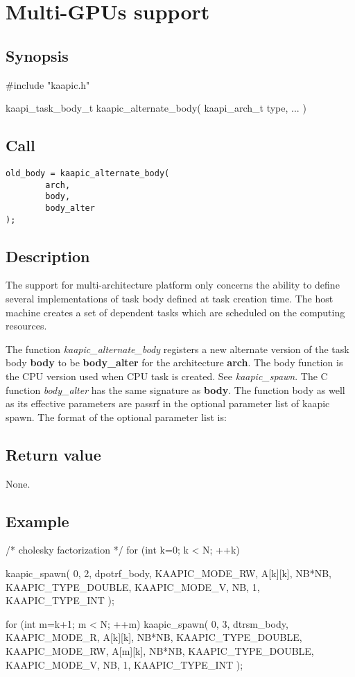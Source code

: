\documentclass[a4paper, 11pt]{article}
\makeatletter
\newenvironment{apisection}[2][noshortnameprovided]{%
  \newpage
  \section{#2}
  \label{api@#1}
  \newcommand{\api@newpart}[4][noshortpartnameprovided]{%
    \newenvironment{##1}{%
      \subsection{##2}%
      \label{api@#1@##1}%
      ##3%
    }{##4}%
  }%
  \api@newpart[synopsis]{Synopsis}{}{}%
  \api@newpart[call]{Call}{}{}%
  \api@newpart[desc]{Description}{}{}%
  \api@newpart[params]{Parameters}{%
    \let\api@indesc\@empty
    \newcommand{\param}[1]{%
      \def\api@indesc{yes}%
      \begin{description}%
        \renewcommand{\param}[1]{\item[########1]}%
      \item[####1]
      }%
      \newenvironment{parameters}{%
        \begin{description}%
          \renewcommand{\param}[1]{\item[########1]}%
        }{%
        \end{description}%
      }
    }{%
      \ifx\api@indesc\@empty\relax\else%
    \end{description}%
    \fi%
  }%
  \api@newpart[ret]{Return value}{%
    \newcommand{\otherret}{\par\medskip\noindent}%
  }{}%
  \api@newpart[example]{Example}{}{}%
}{}
\newcommand{\fn}[1]{\textit{#1}}%
\makeatother
\begin{document}
\begin{apisection}[gpus]{Multi-GPUs support}

  \begin{synopsis}
    \begin{code}
#include "kaapic.h"

kaapi_task_body_t kaapic_alternate_body( 
    kaapi_arch_t type,
    ...
)
    \end{code}
  \end{synopsis}

  \begin{call}
    \begin{small}
      \lstset{language=C}
      \begin{lstlisting}[frame=tb]
old_body = kaapic_alternate_body( 
        arch,
        body, 
        body_alter 
);
      \end{lstlisting}
    \end{small}
  \end{call}

  \begin{desc}
  The support for multi-architecture platform only concerns the ability to define several implementations of task body defined at task creation time. The host machine creates a set of dependent tasks which are scheduled on the computing resources. 
  
The function \fn{kaapic\_alternate\_body} registers a new alternate version of the task body \textbf{body} to be \textbf{body\_alter} for the architecture \textbf{arch}. The body function is the CPU version used when CPU task is created.
See \fn{kaapic\_spawn}. The C function \fn{body\_alter} has the same signature as \textbf{body}.
The function body as well as its effective parameters are passrf in the optional parameter list of kaapic spawn. The format of the optional parameter list is:
  \end{desc}
  \begin{ret}
    None.
  \end{ret}
  \begin{example}
  \begin{code}
    /* cholesky factorization */
    for (int k=0; k < N; ++k)
    {
      kaapic_spawn( 0, 2, dpotrf_body, 
      	KAAPIC_MODE_RW, A[k][k], NB*NB, KAAPIC_TYPE_DOUBLE,
	KAAPIC_MODE_V, NB, 1, KAAPIC_TYPE_INT
      );

      for (int m=k+1; m < N; ++m)
        kaapic_spawn( 0, 3, dtrsm_body, 
          KAAPIC_MODE_R,  A[k][k], NB*NB, KAAPIC_TYPE_DOUBLE,
          KAAPIC_MODE_RW, A[m][k], NB*NB, KAAPIC_TYPE_DOUBLE,
          KAAPIC_MODE_V, NB, 1, KAAPIC_TYPE_INT
        );

}
\end{code}
\end{example}
\end{apisection}
\end{document}

